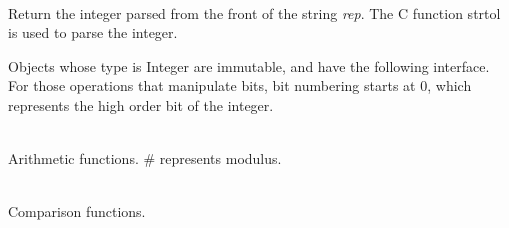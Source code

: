 \begin{desc}
  \item[\kw{function} literal\/\LB{}rep \CO{} \tn{String}\/\RB{} \returns{} \/\LB{}\tn{Integer}\/\RB{}]~\\
    Return the integer parsed from the front of the string {\it rep}.  The C
    function strtol is used to parse the integer.
\end{desc}

\noindent
Objects whose type is Integer are immutable, and have the following
interface.  For those operations that manipulate bits, bit numbering starts at
0, which represents the high order bit of the integer.

\begin{desc}
  \item[\kw{function} \opd{$+$} \/\LB{}\tn{Integer}\/\RB{} \returns{} \/\LB{}\tn{Integer}\/\RB{}]
  \item[\kw{function} \opd{$-$} \/\LB{}\tn{Integer}\/\RB{} \returns{} \/\LB{}\tn{Integer}\/\RB{}]
  \item[\kw{function} \opd{$*$} \/\LB{}\tn{Integer}\/\RB{} \returns{} \/\LB{}\tn{Integer}\/\RB{}]
  \item[\kw{function} \opd{$/$} \/\LB{}\tn{Integer}\/\RB{} \returns{} \/\LB{}\tn{Integer}\/\RB{}]
  \item[\kw{function} \opd{\#} \/\LB{}\tn{Integer}\/\RB{} \returns{} \/\LB{}\tn{Integer}\/\RB{}]~\\
    Arithmetic functions.  \# represents modulus.
  \item[\kw{function} \opd{$>$} \/\LB{}\tn{Integer}\/\RB{} \returns{} \/\LB{}\tn{Boolean}\/\RB{}]
  \item[\kw{function} \opd{$>=$} \/\LB{}\tn{Integer}\/\RB{} \returns{} \/\LB{}\tn{Boolean}\/\RB{}]
  \item[\kw{function} \opd{$<$} \/\LB{}\tn{Integer}\/\RB{} \returns{} \/\LB{}\tn{Boolean}\/\RB{}]
  \item[\kw{function} \opd{$<=$} \/\LB{}\tn{Integer}\/\RB{} \returns{} \/\LB{}\tn{Boolean}\/\RB{}]
  \item[\kw{function} \opd{$=$} \/\LB{}\tn{Integer}\/\RB{} \returns{} \/\LB{}\tn{Boolean}\/\RB{}]
  \item[\kw{function} \opd{$!=$} \/\LB{}\tn{Integer}\/\RB{} \returns{} \/\LB{}\tn{Boolean}\/\RB{}]~\\
  Comparison functions.
  \item[\kw{function} \opd{\tt\mytilde} \returns{} \/\LB{}\tn{Integer}\/\RB{}]~\\

\end{desc}
